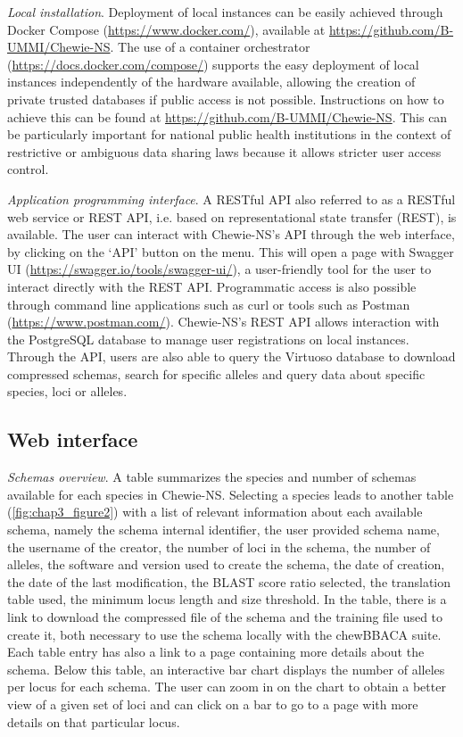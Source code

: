 \textit{Local installation}. Deployment of local instances can be easily achieved through Docker Compose (\url{https://www.docker.com/}), available at \url{https://github.com/B-UMMI/Chewie-NS}. The use of a container orchestrator (\url{https://docs.docker.com/compose/}) supports the easy deployment of local instances independently of the hardware available, allowing the creation of private trusted databases if public access is not possible. Instructions on how to achieve this can be found at \url{https://github.com/B-UMMI/Chewie-NS}. This can be particularly important for national public health institutions in the context of restrictive or ambiguous data sharing laws because it allows stricter user access control.

\textit{Application programming interface}. A \ac{REST}ful \ac{API} also referred to as a \ac{REST}ful web service or \ac{REST} \ac{API}, i.e. based on representational state transfer (REST), is available. The user can interact with \ac{Chewie-NS}’s \ac{API} through the web interface, by clicking on the ‘API’ button on the menu. This will open a page with Swagger \ac{UI} (\url{https://swagger.io/tools/swagger-ui/}), a user-friendly tool for the user to interact directly with the \ac{REST} \ac{API}. Programmatic access is also possible through command line applications such as curl or tools such as Postman (\url{https://www.postman.com/}). \ac{Chewie-NS}’s \ac{REST} \ac{API} allows interaction with the PostgreSQL database to manage user registrations on local instances. Through the \ac{API}, users are also able to query the Virtuoso database to download compressed schemas, search for specific alleles and query data about specific species, loci or alleles.

\subsection{Web interface} \label{ssec:ch3_database_creation_interface}

\textit{Schemas overview}. A table summarizes the species and number of schemas available for each species in \ac{Chewie-NS}. Selecting a species leads to another table (\ref{fig:chap3_figure2}) with a list of relevant information about each available schema, namely the schema internal identifier, the user provided schema name, the username of the creator, the number of loci in the schema, the number of alleles, the software and version used to create the schema, the date of creation, the date of the last modification, the BLAST \cite{altschul_basic_1990} score ratio selected, the translation table used, the minimum locus length and size threshold. In the table, there is a link to download the compressed file of the schema and the training file used to create it, both necessary to use the schema locally with the chewBBACA suite. Each table entry has also a link to a page containing more details about the schema. Below this table, an interactive bar chart displays the number of alleles per locus for each schema. The user can zoom in on the chart to obtain a better view of a given set of loci and can click on a bar to go to a page with more details on that particular locus.

